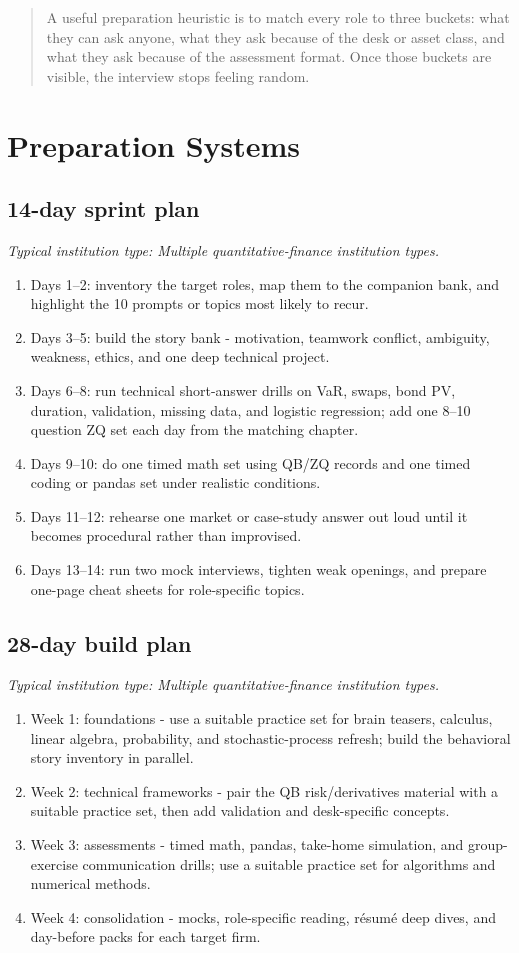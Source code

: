\documentclass[11pt,letterpaper,openany]{book}
\newcommand{\RoleProfile}[2]{%
  \subsection{#1}%
  \noindent\textit{Typical institution type: #2.}\par
}
\newcommand{\playbooknote}[1]{\begin{quote}\small #1\end{quote}}
\begin{document}
\playbooknote{A useful preparation heuristic is to match every role to three buckets: what they can ask anyone, what they ask because of the desk or asset class, and what they ask because of the assessment format. Once those buckets are visible, the interview stops feeling random.}


\section{Preparation Systems}
\RoleProfile{14-day sprint plan}{Multiple quantitative-finance institution types}
\begin{enumerate}
  \item Days 1--2: inventory the target roles, map them to the companion bank, and highlight the 10 prompts or topics most likely to recur.
  \item Days 3--5: build the story bank - motivation, teamwork conflict, ambiguity, weakness, ethics, and one deep technical project.
  \item Days 6--8: run technical short-answer drills on VaR, swaps, bond PV, duration, validation, missing data, and logistic regression; add one 8--10 question ZQ set each day from the matching chapter.
  \item Days 9--10: do one timed math set using QB/ZQ records and one timed coding or pandas set under realistic conditions.
  \item Days 11--12: rehearse one market or case-study answer out loud until it becomes procedural rather than improvised.
  \item Days 13--14: run two mock interviews, tighten weak openings, and prepare one-page cheat sheets for role-specific topics.
\end{enumerate}

\RoleProfile{28-day build plan}{Multiple quantitative-finance institution types}
\begin{enumerate}
  \item Week 1: foundations - use a suitable practice set for brain teasers, calculus, linear algebra, probability, and stochastic-process refresh; build the behavioral story inventory in parallel.
  \item Week 2: technical frameworks - pair the QB risk/derivatives material with a suitable practice set, then add validation and desk-specific concepts.
  \item Week 3: assessments - timed math, pandas, take-home simulation, and group-exercise communication drills; use a suitable practice set for algorithms and numerical methods.
  \item Week 4: consolidation - mocks, role-specific reading, résumé deep dives, and day-before packs for each target firm.
\end{enumerate}
\end{document}
